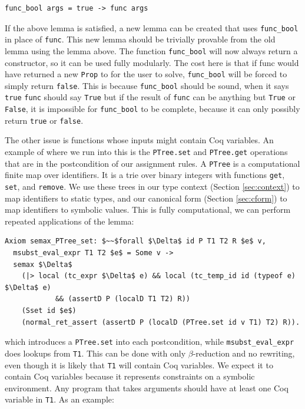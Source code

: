 \documentclass{puthesis}
\begin{document}
\begin{lstlisting}
func_bool args = true -> func args
\end{lstlisting}

If the above lemma is satisfied, a new lemma can be created that uses
\lstinline|func_bool| in place of \lstinline|func|. This new lemma
should be trivially provable from the old lemma using the lemma
above. The function \lstinline|func_bool| will now always return a
constructor, so it can be used fully modularly. The cost here is that
if func would have returned a new \lstinline|Prop| to for the user to
solve, \lstinline|func_bool| will be forced to simply return
\lstinline|false|. This is because \lstinline|func_bool| should be
sound, when it says \lstinline|true| \lstinline|func| should say
\lstinline|True| but if the result of \lstinline|func| can be anything
but \lstinline|True| or \lstinline|False|, it is impossible for
\lstinline|func_bool| to be complete, because it can only possibly
return \lstinline|true| or \lstinline|false|.

The other issue is functions whose inputs might contain Coq
variables. An example of where we run into this is the
\lstinline|PTree.set| and \lstinline|PTree.get| operations that are in
the postcondition of our assignment rules. A \lstinline|PTree| is a
computational finite map over identifiers. It is a trie over binary
integers with functions \lstinline|get|, \lstinline|set|, and
\lstinline|remove|. We use these trees in our type context (Section
\ref{sec:context}) to map identifiers to static types, and our
canonical form (Section \ref{sec:cform}) to map identifiers to
symbolic values. This is fully computational, we can perform repeated
applications of the lemma:

\begin{lstlisting}
Axiom semax_PTree_set: $~~$forall $\Delta$ id P T1 T2 R $e$ v,
  msubst_eval_expr T1 T2 $e$ = Some v ->
  semax $\Delta$
    (|> local (tc_expr $\Delta$ e) && local (tc_temp_id id (typeof e) $\Delta$ e) 
            && (assertD P (localD T1 T2) R))
    (Sset id $e$)
    (normal_ret_assert (assertD P (localD (PTree.set id v T1) T2) R)).
\end{lstlisting}

which introduces a \lstinline|PTree.set| into each postcondition,
while \lstinline|msubst_eval_expr| does lookups from
\lstinline|T1|. This can be done with only $\beta$-reduction and no
rewriting, even though it is likely that \lstinline|T1| will contain
Coq variables. We expect it to contain Coq variables because it
represents constraints on a symbolic environment. Any program that
takes arguments should have at least one Coq variable in
\lstinline|T1|. As an example:
\end{document}
